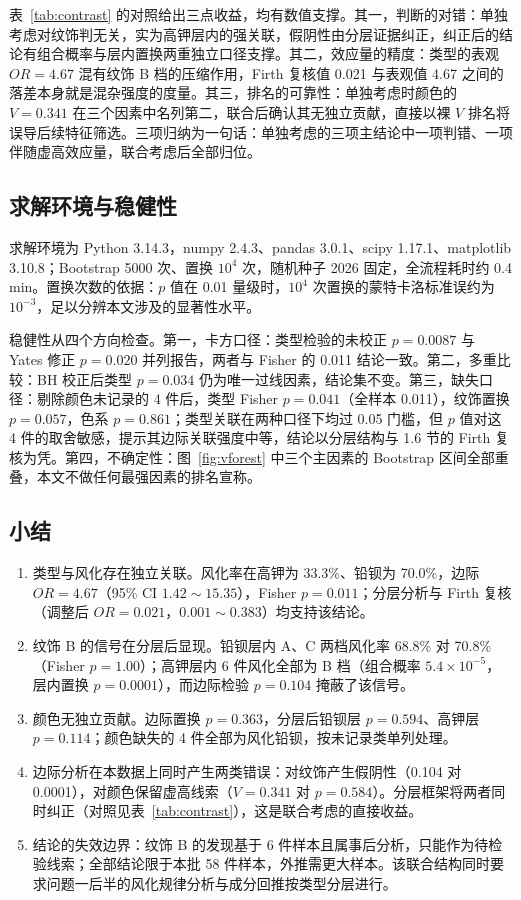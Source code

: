 \documentclass[12pt]{ctexart}
\begin{document}
表~\ref{tab:contrast} 的对照给出三点收益，均有数值支撑。其一，判断的对错：单独考虑对纹饰判无关，实为高钾层内的强关联，假阴性由分层证据纠正，纠正后的结论有组合概率与层内置换两重独立口径支撑。其二，效应量的精度：类型的表观 $OR=4.67$ 混有纹饰 B 档的压缩作用，Firth 复核值 0.021 与表观值 4.67 之间的落差本身就是混杂强度的度量。其三，排名的可靠性：单独考虑时颜色的 $V=0.341$ 在三个因素中名列第二，联合后确认其无独立贡献，直接以裸 $V$ 排名将误导后续特征筛选。三项归纳为一句话：单独考虑的三项主结论中一项判错、一项伴随虚高效应量，联合考虑后全部归位。

\subsection{求解环境与稳健性}

求解环境为 Python 3.14.3，numpy 2.4.3、pandas 3.0.1、scipy 1.17.1、matplotlib 3.10.8；Bootstrap 5000 次、置换 $10^4$ 次，随机种子 2026 固定，全流程耗时约 0.4 min。置换次数的依据：$p$ 值在 0.01 量级时，$10^4$ 次置换的蒙特卡洛标准误约为 $10^{-3}$，足以分辨本文涉及的显著性水平。

稳健性从四个方向检查。第一，卡方口径：类型检验的未校正 $p=0.0087$ 与 Yates 修正 $p=0.020$ 并列报告，两者与 Fisher 的 0.011 结论一致。第二，多重比较：BH 校正后类型 $p=0.034$ 仍为唯一过线因素，结论集不变。第三，缺失口径：剔除颜色未记录的 4 件后，类型 Fisher $p=0.041$（全样本 0.011），纹饰置换 $p=0.057$，色系 $p=0.861$；类型关联在两种口径下均过 0.05 门槛，但 $p$ 值对这 4 件的取舍敏感，提示其边际关联强度中等，结论以分层结构与 1.6 节的 Firth 复核为凭。第四，不确定性：图~\ref{fig:vforest} 中三个主因素的 Bootstrap 区间全部重叠，本文不做任何最强因素的排名宣称。

\subsection{小结}

\begin{enumerate}
\item 类型与风化存在独立关联。风化率在高钾为 33.3\%、铅钡为 70.0\%，边际 $OR=4.67$（95\% CI $1.42\sim 15.35$），Fisher $p=0.011$；分层分析与 Firth 复核（调整后 $OR=0.021$，$0.001\sim 0.383$）均支持该结论。
\item 纹饰 B 的信号在分层后显现。铅钡层内 A、C 两档风化率 68.8\% 对 70.8\%（Fisher $p=1.00$）；高钾层内 6 件风化全部为 B 档（组合概率 $5.4\times 10^{-5}$，层内置换 $p=0.0001$），而边际检验 $p=0.104$ 掩蔽了该信号。
\item 颜色无独立贡献。边际置换 $p=0.363$，分层后铅钡层 $p=0.594$、高钾层 $p=0.114$；颜色缺失的 4 件全部为风化铅钡，按未记录类单列处理。
\item 边际分析在本数据上同时产生两类错误：对纹饰产生假阴性（0.104 对 0.0001），对颜色保留虚高线索（$V=0.341$ 对 $p=0.584$）。分层框架将两者同时纠正（对照见表~\ref{tab:contrast}），这是联合考虑的直接收益。
\item 结论的失效边界：纹饰 B 的发现基于 6 件样本且属事后分析，只能作为待检验线索；全部结论限于本批 58 件样本，外推需更大样本。该联合结构同时要求问题一后半的风化规律分析与成分回推按类型分层进行。
\end{enumerate}
\end{document}
